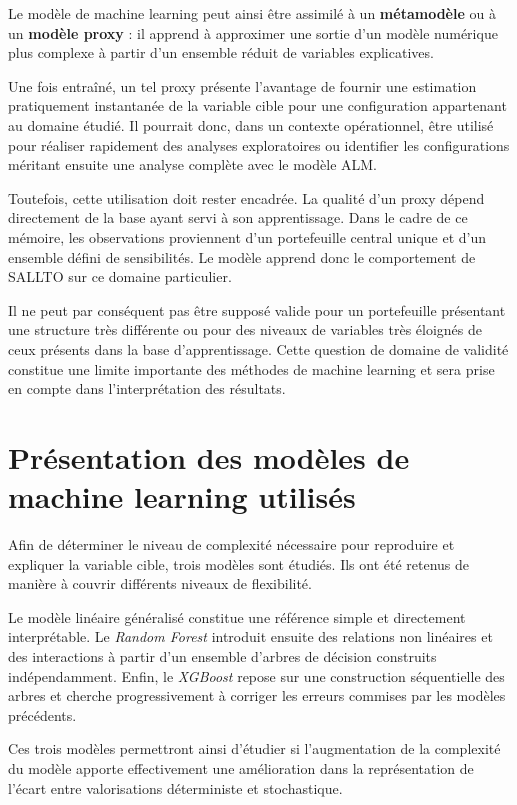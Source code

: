 Le modèle de machine learning peut ainsi être assimilé à un \textbf{métamodèle} ou à un \textbf{modèle proxy} : il apprend à approximer une sortie d'un modèle numérique plus complexe à partir d'un ensemble réduit de variables explicatives.

Une fois entraîné, un tel proxy présente l'avantage de fournir une estimation pratiquement instantanée de la variable cible pour une configuration appartenant au domaine étudié. Il pourrait donc, dans un contexte opérationnel, être utilisé pour réaliser rapidement des analyses exploratoires ou identifier les configurations méritant ensuite une analyse complète avec le modèle ALM.

Toutefois, cette utilisation doit rester encadrée. La qualité d'un proxy dépend directement de la base ayant servi à son apprentissage. Dans le cadre de ce mémoire, les observations proviennent d'un portefeuille central unique et d'un ensemble défini de sensibilités. Le modèle apprend donc le comportement de SALLTO sur ce domaine particulier.

Il ne peut par conséquent pas être supposé valide pour un portefeuille présentant une structure très différente ou pour des niveaux de variables très éloignés de ceux présents dans la base d'apprentissage. Cette question de domaine de validité constitue une limite importante des méthodes de machine learning et sera prise en compte dans l'interprétation des résultats.


\section{Présentation des modèles de machine learning utilisés}

Afin de déterminer le niveau de complexité nécessaire pour reproduire et expliquer la variable cible, trois modèles sont étudiés. Ils ont été retenus de manière à couvrir différents niveaux de flexibilité.

Le modèle linéaire généralisé constitue une référence simple et directement interprétable. Le \textit{Random Forest} introduit ensuite des relations non linéaires et des interactions à partir d'un ensemble d'arbres de décision construits indépendamment. Enfin, le \textit{XGBoost} repose sur une construction séquentielle des arbres et cherche progressivement à corriger les erreurs commises par les modèles précédents.

Ces trois modèles permettront ainsi d'étudier si l'augmentation de la complexité du modèle apporte effectivement une amélioration dans la représentation de l'écart entre valorisations déterministe et stochastique.


